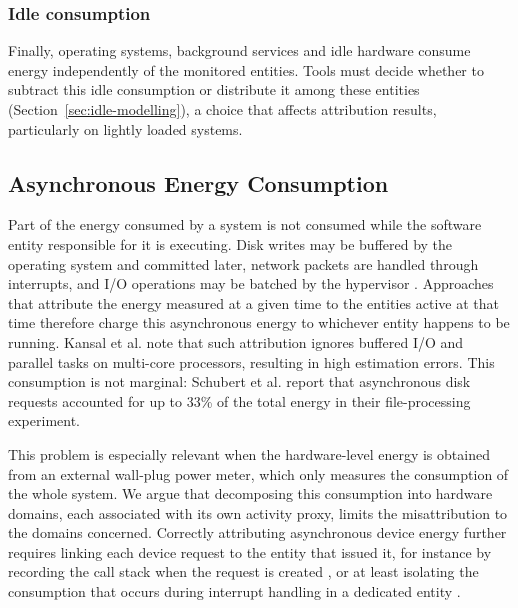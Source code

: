 \documentclass[
  acmsmall,
  screen,
  review,
  xcolor={dvipsnames,usenames}
]{acmart}
\begin{document}
\subsubsection{\textbf{Idle consumption}}

Finally, operating systems, background services and idle hardware consume energy independently of the monitored entities. Tools must decide whether to subtract this idle consumption or distribute it among these entities (Section~\ref{sec:idle-modelling}), a choice that affects attribution results, particularly on lightly loaded systems.


\subsection{Asynchronous Energy Consumption} \label{sec:async-energy}

Part of the energy consumed by a system is not consumed while the software entity responsible for it is executing. Disk writes may be buffered by the operating system and committed later, network packets are handled through interrupts, and I/O operations may be batched by the hypervisor \cite{kansalVirtualMachinePower2010,schubertProfilingSoftwareEnergy2012}. Approaches that attribute the energy measured at a given time to the entities active at that time therefore charge this asynchronous energy to whichever entity happens to be running. Kansal et al. \cite{kansalVirtualMachinePower2010} note that such attribution ignores buffered I/O and parallel tasks on multi-core processors, resulting in high estimation errors. This consumption is not marginal: Schubert et al. \cite{schubertProfilingSoftwareEnergy2012} report that asynchronous disk requests accounted for up to 33\% of the total energy in their file-processing experiment.

This problem is especially relevant when the hardware-level energy is obtained from an external wall-plug power meter, which only measures the consumption of the whole system. We argue that decomposing this consumption into hardware domains, each associated with its own activity proxy, limits the misattribution to the domains concerned. Correctly attributing asynchronous device energy further requires linking each device request to the entity that issued it, for instance by recording the call stack when the request is created \cite{schubertProfilingSoftwareEnergy2012}, or at least isolating the consumption that occurs during interrupt handling in a dedicated entity \cite{flinnPowerScopeToolProfiling1999}.
\end{document}
